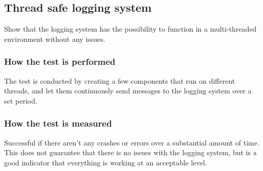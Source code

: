 \subsection{Thread safe logging system}
Show that the logging system has the possibility to function in a multi-threaded environment without any issues.

\subsubsection*{How the test is performed}
The test is conducted by creating a few components that run on different threads, and let them continuously send messages to the logging system over a set period.

\subsubsection*{How the test is measured}
Successful if there aren't any crashes or errors over a substantial amount of time. 
This does not guarantee that there is no issues with the logging system, but is a good indicator that everything is working at an acceptable level.
